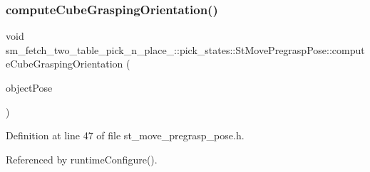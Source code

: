 \subsubsection{\texorpdfstring{compute\+Cube\+Grasping\+Orientation()}{computeCubeGraspingOrientation()}}
{\footnotesize\ttfamily void sm\+\_\+fetch\+\_\+two\+\_\+table\+\_\+pick\+\_\+n\+\_\+place\+\_\+::pick\+\_\+states\+::\+St\+Move\+Pregrasp\+Pose\+::compute\+Cube\+Grasping\+Orientation (\begin{DoxyParamCaption}\item[{geometry\+\_\+msgs\+::\+Pose\+Stamped \&}]{object\+Pose }\end{DoxyParamCaption})\hspace{0.3cm}{\ttfamily [inline]}}



Definition at line 47 of file st\+\_\+move\+\_\+pregrasp\+\_\+pose.\+h.



Referenced by runtime\+Configure().


